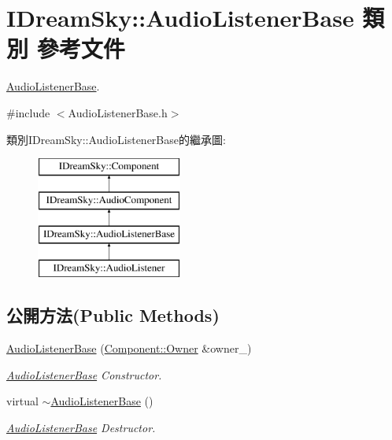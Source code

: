 \hypertarget{class_i_dream_sky_1_1_audio_listener_base}{}\section{I\+Dream\+Sky\+:\+:Audio\+Listener\+Base 類別 參考文件}
\label{class_i_dream_sky_1_1_audio_listener_base}


\hyperlink{class_i_dream_sky_1_1_audio_listener_base}{Audio\+Listener\+Base}.  




{\ttfamily \#include $<$Audio\+Listener\+Base.\+h$>$}

類別\+I\+Dream\+Sky\+:\+:Audio\+Listener\+Base的繼承圖\+:\begin{figure}[H]
\begin{center}
\leavevmode
\includegraphics[height=4.000000cm]{class_i_dream_sky_1_1_audio_listener_base}
\end{center}
\end{figure}
\subsection*{公開方法(Public Methods)}
\begin{DoxyCompactItemize}
\item 
\hyperlink{class_i_dream_sky_1_1_audio_listener_base_ada07dfbfb9e983366135c278d3655d0a}{Audio\+Listener\+Base} (\hyperlink{class_i_dream_sky_1_1_component_1_1_owner}{Component\+::\+Owner} \&owner\+\_\+)
\begin{DoxyCompactList}\small\item\em \hyperlink{class_i_dream_sky_1_1_audio_listener_base}{Audio\+Listener\+Base} Constructor. \end{DoxyCompactList}\item 
virtual \hyperlink{class_i_dream_sky_1_1_audio_listener_base_a8481bd840e88b15f34da95a5f1340149}{$\sim$\+Audio\+Listener\+Base} ()
\begin{DoxyCompactList}\small\item\em \hyperlink{class_i_dream_sky_1_1_audio_listener_base}{Audio\+Listener\+Base} Destructor. \end{DoxyCompactList}\end{DoxyCompactItemize}
